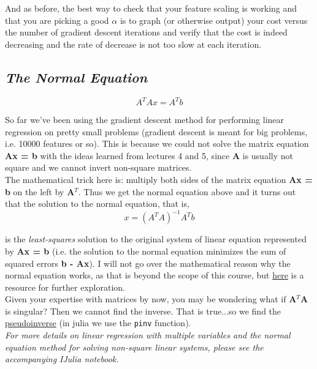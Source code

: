 \documentclass[11pt,a4paper,oneside]{report}
\begin{document}
And as before, the best way to check that your feature scaling is working and that you are picking a good $\alpha$ is to graph (or otherwise output) your cost versus the number of gradient descent iterations and verify that the cost is indeed decreasing and the rate of decrease is not too slow at each iteration.\\

{\center\color{magenta}
\subsection*{\it\huge The Normal Equation}}

\[ A^TAx = A^Tb \]

So far we've been using the gradient descent method for performing linear regression on pretty small problems (gradient descent is meant for big problems, i.e. 10000 features or so). This is because we could not solve the matrix equation {\bf Ax = b} with the ideas learned from lectures 4 and 5, since {\bf A} is usually not square and we cannot invert non-square matrices.\\

The mathematical trick here is: multiply both sides of the matrix equation {\bf Ax = b} on the left by {\bf A}$^T$. Thus we get the normal equation above and it turns out that the solution to the normal equation, that is,
\[ x = (A^TA)^{-1}A^Tb \]

is the \emph{least-squares} solution to the original system of linear equation represented by {\bf Ax = b} (i.e. the solution to the normal equation minimizes the sum of squared errors {\bf b - Ax}). I will not go over the mathematical reason why the normal equation works, as that is beyond the scope of this course, but \href{http://math.mit.edu/linearalgebra/ila0403.pdf}{here} is a resource for further exploration.\\

Given your expertise with matrices by now, you may be wondering what if {\bf A}$^T${\bf A} is singular? Then we cannot find the inverse. That is true...so we find the \href{https://en.wikipedia.org/wiki/Moore%E2%80%93Penrose_pseudoinverse}{pseudoinverse} (in julia we use the \verb+pinv+ function).\\ 

{\it For more details on linear regression with multiple variables and the normal equation method for solving non-square linear systems, please see the accompanying IJulia notebook.}\\
\end{document}
